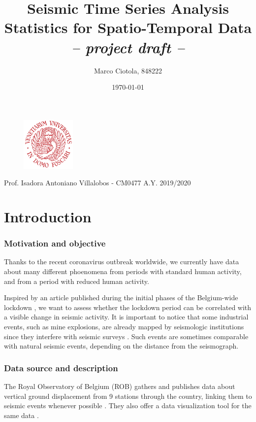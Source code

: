 \documentclass[12pt]{article}
\title{Seismic Time Series Analysis\\Statistics for Spatio-Temporal Data\\\textit{-- project draft --}}
\author{Marco Ciotola, 848222}
\date{\today}
\begin{document}
\maketitle
\begin{figure}[t!]
	\begin{center}
		\includegraphics[width=100px]{ca_foscari_logo.png}
	\end{center}
\end{figure}
\vfill Prof. Isadora Antoniano Villalobos - CM0477
\hfill A.Y. 2019/2020
\newpage
\tableofcontents \clearpage
{}



\section{Introduction}

\subsubsection{Motivation and objective}
Thanks to the recent coronavirus outbreak worldwide, we currently have data about many different phoenomena from periods with standard human activity, and from a period with reduced human activity.

Inspired by an article published during the initial phases of the Belgium-wide lockdown \cite{NatureCoronavirusSeismic}, we want to assess whether the lockdown period can be correlated with a visible change in seismic activity.
It is important to notice that some industrial events, such as mine explosions, are already mapped by seismologic institutions since they interfere with seismic surveys \cite{OtherSeismicEvents}. Such events are sometimes comparable with natural seismic events, depending on the distance from the seismograph.

\subsubsection{Data source and description}
The Royal Observatory of Belgium (ROB) gathers and publishes \cite{RoyalDataPolicy,Data20200402} data about vertical ground displacement from 9 stations through the country, linking them to seismic events whenever possible \cite{DataEvents20200402}. They also offer a data visualization tool for the same data \cite{DataVisualization20200402}.
\end{document}
